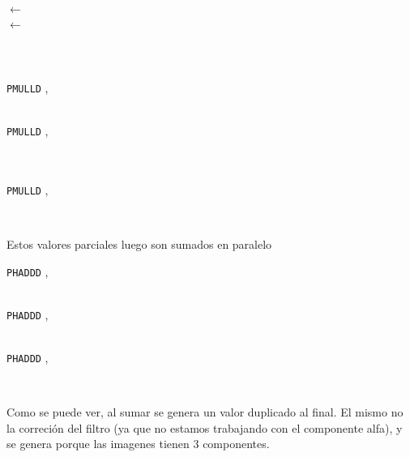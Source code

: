 \begin{center}

  \\

 $\leftarrow$  \\
 $\leftarrow$  \\

  \\
  \\
  \\

\texttt{PMULLD} ,  \hfill

  \\


\texttt{PMULLD} ,  \hfill

  \\


  \\

\texttt{PMULLD} ,  \hfill

  \\

\end{center}

Estos valores parciales luego son sumados en paralelo

\begin{center}

\texttt{PHADDD} ,  \hfill

  \\


\texttt{PHADDD} ,  \hfill

  \\

\texttt{PHADDD} ,  \hfill

  \\

\end{center}

Como se puede ver, al sumar se genera un valor duplicado al final. El mismo no la correción del filtro (ya que no estamos trabajando con el componente alfa), y se genera porque las imagenes tienen 3 componentes.

